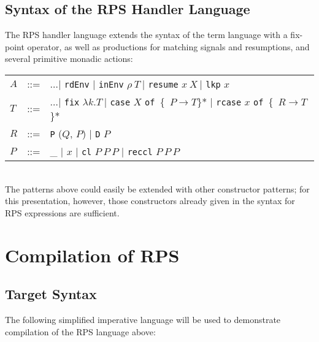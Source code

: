 \documentclass[a4paper,10pt]{article}
\begin{document}
\subsection{Syntax of the RPS Handler Language}

The RPS handler language extends the syntax of the term language with a fix-point operator, as well as  productions for matching signals and resumptions, and several primitive monadic actions:\\

\begin{tabular}[t]{lll}

$A$ &::=& $\ldots \vert$ \texttt{rdEnv} $\vert$ \texttt{inEnv} $\rho\ T\ \vert$ \texttt{resume} $x\ X\ \vert$ \texttt{lkp} $x$\\

$T$ &::=& $\ldots \vert$ \texttt{fix} $\lambda k. T\ \vert$ \texttt{case} $X$ \texttt{of }\{\ $P \rightarrow T$\}*
$\vert$ \texttt{rcase} $x$ \texttt{of }\{\ $R \rightarrow T$\}*\\

$R$ &::=& \texttt{P} ($Q$, $P$) $\vert$ \texttt{D} $P$\\
$P$ &::=& \_ $\vert$ $x$ $\vert$ \texttt{cl} $P\ P\ P$ $\vert$ \texttt{reccl} $P\ P\ P$\\

\end{tabular}
\\
The patterns above could easily be extended with other constructor patterns; for this presentation, however, those constructors already given in the syntax for RPS expressions are sufficient.


\section{Compilation of RPS}

\subsection{Target Syntax}

The following simplified imperative language will be used to demonstrate compilation of the RPS language above:
\end{document}
